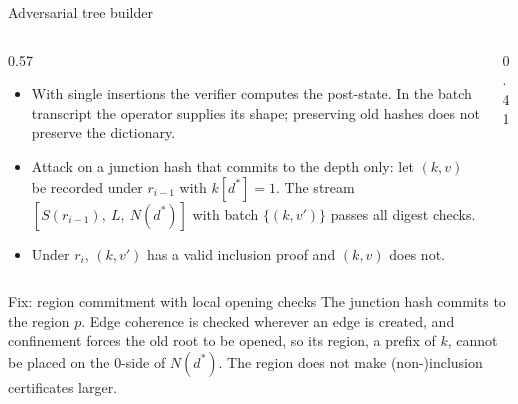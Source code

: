 \documentclass[aspectratio=169,10pt]{beamer}
\begin{document}
\begin{frame}{Adversarial tree builder}
\begin{columns}[T]
\begin{column}{0.57\textwidth}
\small
\begin{itemize}
  \item With single insertions the verifier computes the post-state. In the batch transcript the operator supplies its shape; preserving old hashes does not preserve the dictionary.
  \item Attack on a junction hash that commits to the depth only: let $(k,v)$ be recorded under $r_{i-1}$ with $k[d^*] = 1$. The stream $[S(r_{i-1}),\ L,\ N(d^*)]$ with batch $\{(k,v')\}$ passes all digest checks.
  \item Under $r_i$, $(k,v')$ has a valid inclusion proof and $(k,v)$ does not.
\end{itemize}
\end{column}
\begin{column}{0.41\textwidth}
\centering
{}
\end{column}
\end{columns}

\vspace{-1mm}
\begin{block}{Fix: region commitment with local opening checks}
\footnotesize
The junction hash commits to the region $p$. Edge coherence is checked wherever an edge is created, and confinement forces the old root to be opened, so its region, a prefix of $k$, cannot be placed on the $0$-side of $N(d^*)$. The region does not make (non-)inclusion certificates larger.
\end{block}
\end{frame}
\end{document}

